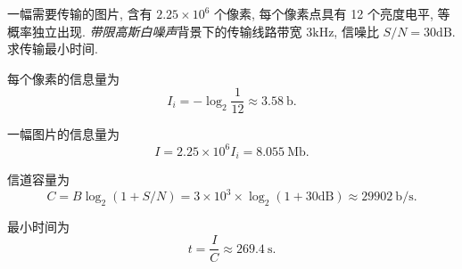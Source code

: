 \begin{exampleprob}[信道容量的应用]
    一幅需要传输的图片, 含有 $2.25\times10^6$ 个像素, 每个像素点具有 12 个亮度电平, 等概率独立出现. \textit{带限高斯白噪声}背景下的传输线路带宽 $3\mathrm{kHz}$, 信噪比 $S/N=30\mathrm{dB}$. 求传输最小时间.

    \begin{solution}
        每个像素的信息量为
        \begin{equation*}
            I_i=-\log_2\frac{1}{12}\approx3.58\ \mathrm{b}.
        \end{equation*}

        一幅图片的信息量为
        \begin{equation*}
            I=2.25\times10^6I_i=8.055\ \mathrm{Mb}.
        \end{equation*}

        信道容量为
        \begin{equation*}
            C=B\log_2(1+S/N)=3\times10^3\times\log_2(1+30\mathrm{dB})\approx29902\ \mathrm{b/s}.
        \end{equation*}

        最小时间为
        \begin{equation*}
            t=\frac{I}{C}\approx269.4\ \mathrm{s}.
        \end{equation*}
    \end{solution}
\end{exampleprob}

